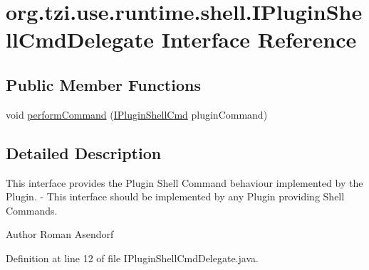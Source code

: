 \hypertarget{interfaceorg_1_1tzi_1_1use_1_1runtime_1_1shell_1_1_i_plugin_shell_cmd_delegate}{\section{org.\-tzi.\-use.\-runtime.\-shell.\-I\-Plugin\-Shell\-Cmd\-Delegate Interface Reference}
\label{interfaceorg_1_1tzi_1_1use_1_1runtime_1_1shell_1_1_i_plugin_shell_cmd_delegate}
}
\subsection*{Public Member Functions}
\begin{DoxyCompactItemize}
\item 
void \hyperlink{interfaceorg_1_1tzi_1_1use_1_1runtime_1_1shell_1_1_i_plugin_shell_cmd_delegate_aae3f4d69bec528f134fdd97a3bd4ff1f}{perform\-Command} (\hyperlink{interfaceorg_1_1tzi_1_1use_1_1main_1_1shell_1_1runtime_1_1_i_plugin_shell_cmd}{I\-Plugin\-Shell\-Cmd} plugin\-Command)
\end{DoxyCompactItemize}


\subsection{Detailed Description}
This interface provides the Plugin Shell Command behaviour implemented by the Plugin. -\/ This interface should be implemented by any Plugin providing Shell Commands.

\begin{DoxyAuthor}{Author}
Roman Asendorf 
\end{DoxyAuthor}


Definition at line 12 of file I\-Plugin\-Shell\-Cmd\-Delegate.\-java.



